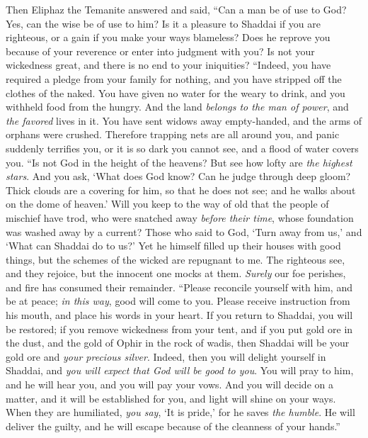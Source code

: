 \begin{biblechapter} %
 Then Eliphaz the Temanite answered and said,
\verse “Can a man be of use to God? 
Yes, can the wise be of use to him?
\verse Is it a pleasure to Shaddai if you are righteous, 
or a gain if you make your ways blameless?
\verse Does he reprove you because of your reverence 
or enter into judgment with you?
\verse Is not your wickedness great, 
and there is no end to your iniquities?
\verse “Indeed, you have required a pledge from your family for nothing, 
and you have stripped off the clothes of the naked.
\verse You have given no water for the weary to drink, 
and you withheld food from the hungry.
\verse And the land \textit{belongs to the man of power}, 
and \textit{the favored} lives in it.
\verse You have sent widows away empty-handed, 
and the arms of orphans were crushed.
\verse Therefore trapping nets are all around you, 
and panic suddenly terrifies you,
\verse or it is so dark you cannot see, 
and a flood of water covers you.
\verse “Is not God in the height of the heavens? 
But see how lofty are \textit{the highest stars}.
\verse And you ask, ‘What does God know? 
Can he judge through deep gloom?
\verse Thick clouds are a covering for him, so that he does not see; 
and he walks about on the dome of heaven.’
\verse Will you keep to the way of old 
that the people of mischief have trod,
\verse who were snatched away \textit{before their time}, 
whose foundation was washed away by a current?
\verse Those who said to God, ‘Turn away from us,’ 
and ‘What can Shaddai do to us?’
\verse Yet he himself filled up their houses with good things, 
but the schemes of the wicked are repugnant to me.
\verse The righteous see, and they rejoice, 
but the innocent one mocks at them.
\verse \textit{Surely} our foe perishes, 
and fire has consumed their remainder.
\verse “Please reconcile yourself with him, 
and be at peace; \textit{in this way}, good will come to you.
\verse Please receive instruction from his mouth, 
and place his words in your heart.
\verse If you return to Shaddai, you will be restored; 
if you remove wickedness from your tent,
\verse and if you put gold ore in the dust, 
and the gold of Ophir in the rock of wadis,
\verse then Shaddai will be your gold ore 
and \textit{your precious silver}.
\verse Indeed, then you will delight yourself in Shaddai, 
and \textit{you will expect that God will be good to you}.
\verse You will pray to him, and he will hear you, 
and you will pay your vows.
\verse And you will decide on a matter, and it will be established for you, 
and light will shine on your ways.
\verse When they are humiliated, \textit{you say}, ‘It is pride,’ 
for he saves \textit{the humble}.
\verse He will deliver the guilty, 
and he will escape because of the cleanness of your hands.”
\end{biblechapter}

